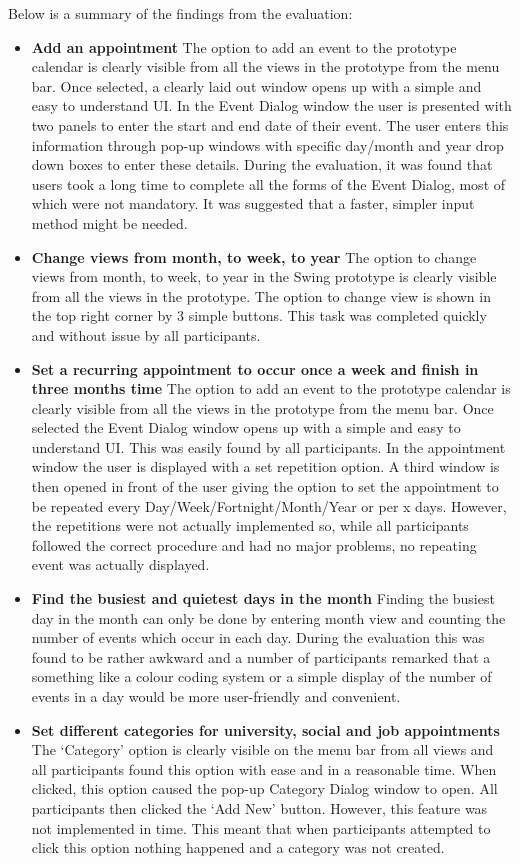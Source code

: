 \documentclass{article}
\begin{document}
Below is a summary of the findings from the evaluation:

\begin{itemize}
\item \textbf{Add an appointment}
The option to add an event to the prototype calendar is clearly visible from all the views in the prototype from the menu bar.
Once selected, a clearly laid out window opens up with a simple and easy to understand UI. In the Event Dialog window the user is presented with two panels to enter the start and end date of their event. The user enters this information through pop-up windows with specific day/month and year drop down boxes to enter these details. During the evaluation, it was found that users took a long time to complete all the forms of the Event Dialog, most of which were not mandatory. It was suggested that a faster, simpler input method might be needed. 
\item \textbf{Change views from month, to week, to year}
The option to change views from month, to week, to year in the Swing prototype is clearly visible from all the views in the prototype. The option to change view is shown in the top right corner by 3 simple buttons. This task was
completed quickly and without issue by all participants.
\item \textbf{Set a recurring appointment to occur once a week and finish in three months time}
The option to add an event to the prototype calendar is clearly visible from all the views in the prototype from the menu bar.
Once selected the Event Dialog window opens up with a simple and easy to understand UI. This was easily found by all participants. In the appointment window the user is displayed with a set repetition option. A third window is then opened in front of the user giving the option to set the appointment to be repeated every Day/Week/Fortnight/Month/Year or per x days.
However, the repetitions were not actually implemented so, while all
participants followed the correct procedure and had no major problems,
no repeating event was actually displayed.
\item \textbf{Find the busiest and quietest days in the month}
Finding the busiest day in the month can only be done by entering month
view and counting the number of events which occur in each day. During
the evaluation this was found to be rather awkward and a number of
participants remarked that a something like a colour coding system or a
simple display of the number of events in a day would be more
user-friendly and convenient.
\item \textbf{Set different categories for university, social and job appointments}
The `Category' option is clearly visible on the menu bar from all views
and all participants found this option with ease and in a reasonable
time. When clicked, this option caused the pop-up Category Dialog window
to open. All participants then clicked the `Add New' button. However,
this feature was not implemented in time. This meant that when
participants attempted to click this option nothing happened and a
category was not created.
\end{itemize}
\end{document}
